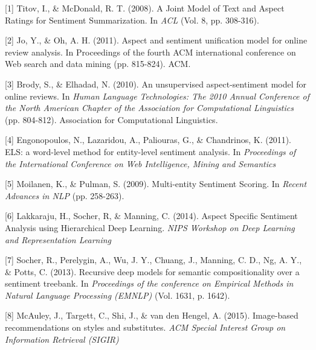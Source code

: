 \documentclass{article} %
\begin{document}
\small{

[1] Titov, I., \& McDonald, R. T. (2008). A Joint Model of Text and Aspect Ratings for Sentiment Summarization. In {\it ACL} (Vol. 8, pp. 308-316).

[2] Jo, Y., \& Oh, A. H. (2011). Aspect and sentiment unification model for online review analysis. In Proceedings of the fourth ACM international conference on Web search and data mining (pp. 815-824). ACM.

[3] Brody, S., \& Elhadad, N. (2010). An unsupervised aspect-sentiment model for online reviews. In {\it Human Language Technologies: The 2010 Annual Conference of the North American Chapter of the Association for Computational Linguistics} (pp. 804-812). Association for Computational Linguistics.

[4] Engonopoulos, N., Lazaridou, A., Paliouras, G., \& Chandrinos, K. (2011). ELS: a word-level method for entity-level sentiment analysis. In {\it Proceedings of the International Conference on Web Intelligence, Mining and Semantics}


[5] Moilanen, K., \& Pulman, S. (2009). Multi-entity Sentiment Scoring. In {\it Recent Advances in NLP} (pp. 258-263).


[6] Lakkaraju, H., Socher, R, \& Manning, C. (2014). Aspect Specific Sentiment Analysis using Hierarchical Deep Learning. {\it NIPS Workshop on Deep Learning and Representation Learning}

[7] Socher, R., Perelygin, A., Wu, J. Y., Chuang, J., Manning, C. D., Ng, A. Y., \& Potts, C. (2013). Recursive deep models for semantic compositionality over a sentiment treebank. In {\it Proceedings of the conference on Empirical Methods in Natural Language Processing (EMNLP)} (Vol. 1631, p. 1642).






[8] McAuley, J., Targett, C., Shi, J., \& van den Hengel, A. (2015). Image-based recommendations on styles and substitutes. {\it ACM Special Interest Group on Information Retrieval (SIGIR)}

}
\end{document}

